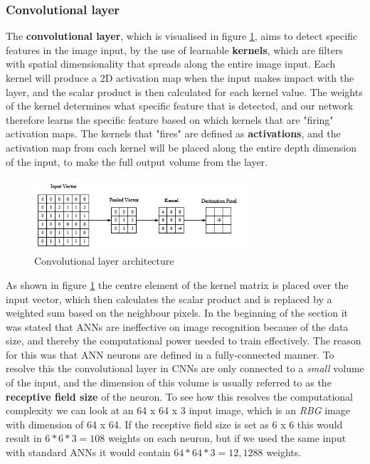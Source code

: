 \subsubsection{Convolutional layer}
The \textbf{convolutional layer}, which is visualised in figure \ref{fig:convolutional}, aims to detect specific features in the image input, by the use of learnable \textbf{kernels}, which are filters with spatial dimensionality that spreads along the entire image input. Each kernel will produce a 2D activation map when the input makes impact with the layer, and the scalar product is then calculated for each kernel value. The weights of the kernel determines what specific feature that is detected, and our network therefore learns the specific feature based on which kernels that are "firing" activation maps. The kernels that "fires" are defined as \textbf{activations}, and the activation map from each kernel will be placed along the entire depth dimension of the input, to make the full output volume from the layer.
\begin{figure}[H]
    \centering
    \includegraphics[width=0.7\textwidth]{images/chap2/convolutional_layer.png}
    \caption{Convolutional layer architecture \cite{Keiron}}
    \label{fig:convolutional}
\end{figure}
As shown in figure \ref{fig:convolutional} the centre element of the kernel matrix is placed over the input vector, which then calculates the scalar product and is replaced by a weighted sum based on the neighbour pixels. In the beginning of the section it was stated that ANNs are ineffective on image recognition because of the data size, and thereby the computational power needed to train effectively. The reason for this was that ANN neurons are defined in a fully-connected manner. To resolve this the convolutional layer in CNNs are only connected to a \textit{small} volume of the input, and the dimension of this volume is usually referred to as the \textbf{receptive field size} of the neuron. To see how this resolves the computational complexity we can look at an 64 x 64 x 3 input image, which is an \textit{RBG} image with dimension of 64 x 64. If the receptive field size is set as 6 x 6 this would result in $6*6*3=108$ weights on each neuron, but if we used the same input with standard ANNs it would contain $64*64*3=12,1288$ weights.\\\\
